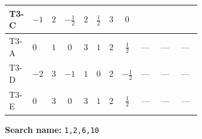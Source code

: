 \documentclass[8pt]{article}
\begin{document}
\begin{landscape}
\begin{longtable}{@{}llcccccc >{\raggedright\arraybackslash}p{0.21\linewidth} >{\raggedright\arraybackslash}p{0.21\linewidth} >{\raggedright\arraybackslash}p{0.21\linewidth}@{}}
T3-C & $-1$ & $2$ & $-\frac{1}{2}$ & $2$ & $\frac{1}{2}$ & $3$ & $0$ & \scriptsize\adjustbox{max width=\linewidth}{$\begin{gathered} - \frac{lambda12Inv2 \overline{y_{1}} \overline{y_{2}}}{6 MF}\end{gathered}$} & \scriptsize\adjustbox{max width=\linewidth}{$\begin{gathered} - \frac{\sqrt{3} g_{2}^{2} \overline{y_{1}} \overline{y_{2}}}{8 MF}\end{gathered}$} & \scriptsize\adjustbox{max width=\linewidth}{$\begin{gathered} \frac{\sqrt{3} ye \overline{y_{1}} \overline{y_{2}} \overline{ye}}{24 MF}\end{gathered}$} \\
\midrule
T3-A & $0$ & $1$ & $0$ & $3$ & $1$ & $2$ & $\frac{1}{2}$ & --- & --- & --- \\
\midrule
T3-D & $-2$ & $3$ & $-1$ & $1$ & $0$ & $2$ & $-\frac{1}{2}$ & --- & --- & --- \\
\midrule
T3-E & $0$ & $3$ & $0$ & $3$ & $1$ & $2$ & $\frac{1}{2}$ & --- & --- & --- \\
\midrule
\bottomrule
\end{longtable}
\clearpage
\noindent\textbf{Search name: }\texttt{1,2,6,10}\par\smallskip

\end{landscape}
\end{document}
